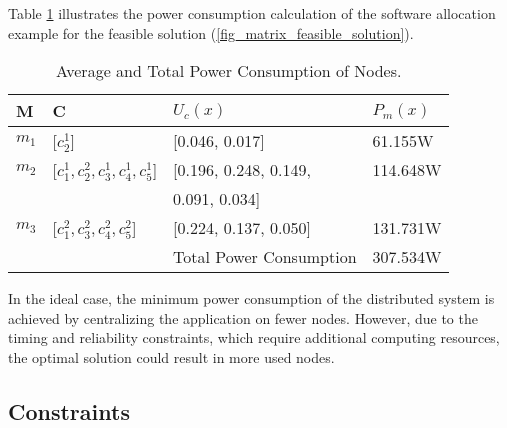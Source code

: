 Table \ref{tbl_powerconsumption} illustrates the power consumption calculation of the software allocation example for the feasible solution (\ref{fig_matrix_feasible_solution}).

\begin{table}[h]
\linespread{1.0}\small
\centering
\begin{tabular}{@{}llll@{}}
\toprule
M  & C                             					& $U_c (x)$                                    & $P_m (x)$      \\ \midrule
$m_1$ & {[}$c^1_2${]}                     			& {[}0.046, 0.017{]}                       & 61.155W  \\[0.3em]
$m_2$ & {[}$c^1_1, c^2_2, c^1_3, c^1_4, c^1_5${]} 	& {[}0.196, 0.248, 0.149, & 114.648W \\[0.3em]
		& & 0.091, 0.034{]} &\\[0.3em]
$m_3$ & {[}$c^2_1, c^2_3, c^2_4, c^2_5${]}     		& {[}0.224, 0.137, 0.050{]}                & 131.731W \\[0.3em] \bottomrule
& & Total Power Consumption & 307.534W\\
\end{tabular}
\caption{Average and Total Power Consumption of Nodes.}
\label{tbl_powerconsumption}
\end{table}

In the ideal case, the minimum power consumption of the distributed system is achieved by centralizing the application on fewer nodes. However, due to the timing and reliability constraints, which require additional computing resources, the optimal solution could result in more used nodes. 

\subsection{Constraints}
